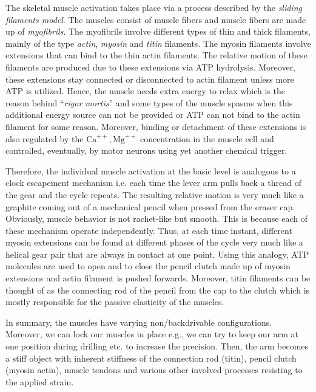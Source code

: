 The skeletal muscle activation takes place via a process described by the \emph{sliding filaments model}. The muscles 
consist of muscle fibers and muscle fibers are made up of \emph{myofibrils}. The myofibrils involve different types of thin 
and thick filaments, mainly of the type \emph{actin}, \emph{myosin} and \emph{titin} filaments. The myosin filaments involve 
extensions that can bind to the thin actin filaments. The relative motion of these filaments are produced due to these 
extensions via ATP hydrolysis. Moreover, these extensions stay connected or disconnected to actin filament unless more 
ATP is utilized. Hence, the muscle needs extra energy to relax which is the reason behind \enquote{\emph{rigor mortis}} 
and some types of the muscle spasms when this additional energy source can not be provided or ATP can not bind to the 
actin filament for some reason. Moreover, binding or detachment of these extensions is also regulated by the 
$\mathrm{Ca}^{++},\mathrm{Mg}^{++}$ concentration in the muscle cell and controlled, eventually, by motor neurons using yet another 
chemical trigger. 


Therefore, the individual muscle activation at the basic level is analogous to a clock escapement mechanism \cite{headrick} 
i.e. each time the lever arm pulls back a thread of the gear and the cycle repeats. The resulting relative motion is very much 
like a graphite coming out of a mechanical pencil when pressed from the eraser cap. Obviously, muscle behavior is not rachet-like 
but smooth. This is because each of these mechanism operate independently. Thus, at each time instant, different myosin extensions 
can be found at different phases of the cycle very much like a helical gear pair that are always in contact at one point. 
Using this analogy, ATP molecules are used to open and to close the pencil clutch made up of myosin extensions and actin filament 
is pushed forwards. Moreover, titin filaments can be thought of as the connecting rod of the pencil from the cap to the clutch which 
is mostly responsible for the passive elasticity of the muscles. 

In summary, the muscles have varying non/backdrivable configurations. Moreover, we can lock our muscles in place
e.g., we can try to keep our arm at one position during drilling etc. to increase the precision. Then, the arm becomes
a stiff object with inherent stiffness of the connection rod (titin), pencil clutch (myosin actin), muscle tendons and
 various other involved processes resisting to the applied strain. 

